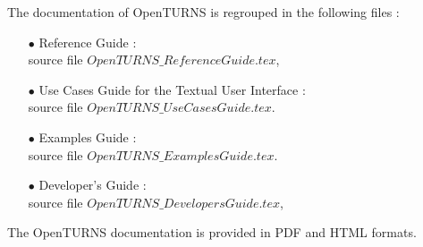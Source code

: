 \documentclass[11pt]{article}
\begin{document}
The documentation of OpenTURNS is regrouped in the following files :
\begin{itemize}
\item[$\bullet$] Reference Guide : \\
  source file $OpenTURNS\_ReferenceGuide.tex$,
\item[$\bullet$] Use Cases Guide for the Textual User Interface : \\
  source file $OpenTURNS\_UseCasesGuide.tex$.
\item[$\bullet$] Examples Guide : \\
  source file $OpenTURNS\_ExamplesGuide.tex$.
\item[$\bullet$] Developer's Guide : \\
  source file $OpenTURNS\_DevelopersGuide.tex$,
\end{itemize}
\vspace*{0.5cm}
The OpenTURNS documentation is provided in PDF and HTML formats.
\end{document}
